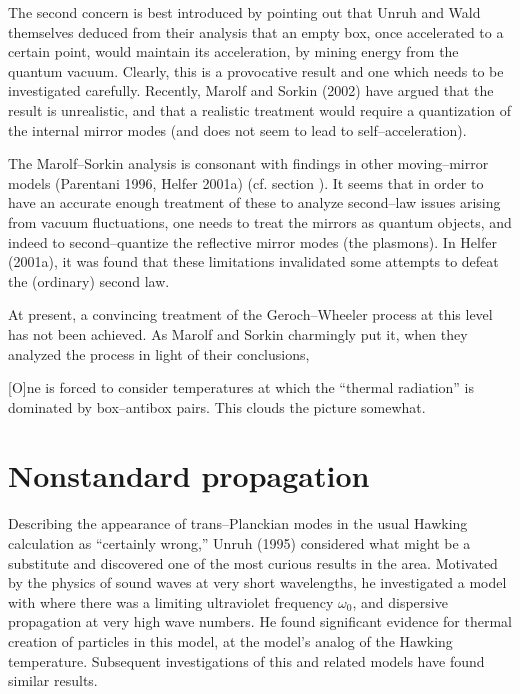 The second concern is best introduced by pointing out that Unruh and Wald
themselves deduced from their analysis that an empty box, once accelerated to a
certain point, would maintain its acceleration, by mining energy from the
quantum vacuum.  Clearly, this is a provocative result and one which needs to
be investigated carefully.  Recently, Marolf and Sorkin (2002) have argued that
the result is unrealistic, and that a realistic treatment would require a
quantization of the internal mirror modes (and does not seem to lead to
self--acceleration).

The Marolf--Sorkin analysis is consonant with findings in other moving--mirror
models (Parentani 1996, Helfer 2001a) (cf. section \mirsec ).   It seems that
in order to have an accurate enough treatment of these to analyze second--law
issues arising from vacuum fluctuations, one needs to treat the mirrors as
quantum objects, and indeed to second--quantize the reflective mirror modes
(the plasmons).  In Helfer (2001a), it was found that these limitations
invalidated some attempts to defeat the (ordinary) second law.

At present, a convincing treatment of the Geroch--Wheeler process at this
level has not been achieved. As Marolf and Sorkin  charmingly put it, when
they  analyzed the process in light of their conclusions,

\itemitem{} [O]ne is forced to consider temperatures at which the ``thermal
radiation'' is dominated by box--antibox pairs.  This clouds the picture
somewhat.

\section{Nonstandard propagation}

Describing the appearance of trans--Planckian modes in the usual Hawking
calculation as ``certainly wrong,''  Unruh (1995) considered what might be a
substitute and discovered one of the most curious results in the area. 
Motivated by the physics of sound waves at very short wavelengths, he
investigated a model with where there was a limiting ultraviolet frequency
$\omega _0$, and dispersive propagation at very high wave numbers.  He found
significant evidence for thermal creation of particles in this model, at the
model's analog of the Hawking temperature.  Subsequent investigations of this
and related models have found similar results. 

